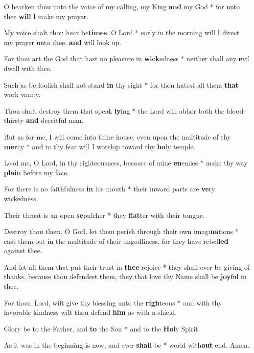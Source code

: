 \begin{multicols}{2}
	O hearken thou unto the voice of my calling, my King \textbf{and} my God * for unto thee \textbf{will} I make my prayer.
	
	My voice shalt thou hear be\textbf{times}, O Lord * early in the morning will I direct my prayer unto thee, \textbf{and} will look up.
	
	For thou art the God that hast no pleasure in \textbf{wick}edness * neither shall any \textbf{e}vil dwell with thee.
	
	Such as be foolish shall not stand \textbf{in} thy sight * for thou hatest all them \textbf{that} work vanity.
	
	Thou shalt destroy them that speak \textbf{ly}ing * the Lord will abhor both the blood-thirsty \textbf{and} deceitful man.
	
	But as for me, I will come into thine house, even upon the multitude of thy \textbf{mer}cy * and in thy fear will I worship toward thy \textbf{ho}ly temple.
	
	Lead me, O Lord, in thy righteousness, because of mine \textbf{en}emies * make thy way \textbf{plain} before my face.
	
	For there is no faithfulness \textbf{in} his mouth * their inward parts are \textbf{ve}ry wickedness.
	
	Their throat is an open \textbf{se}pulcher * they \textbf{flat}ter with their tongue.
	
	Destroy thou them, O God, let them perish through their own imagi\textbf{na}tions * cast them out in the multitude of their ungodliness, for they have rebel\textbf{led} against thee.
	
	And let all them that put their trust in \textbf{thee} rejoice * they shall ever be giving of thanks, because thou defendest them, they that love thy Name shall be \textbf{joy}ful in thee.
	
	For thou, Lord, wilt give thy blessing unto the \textbf{righ}teous * and with thy favorable kindness wilt thou defend \textbf{him} as with a shield.
	
	Glory be to the Father, and \textbf{to} the Son * and to the \textbf{Ho}ly Spirit.
	
	As it was in the beginning is now, and ever \textbf{shall} be * world with\textbf{out} end. Amen.
\end{multicols}